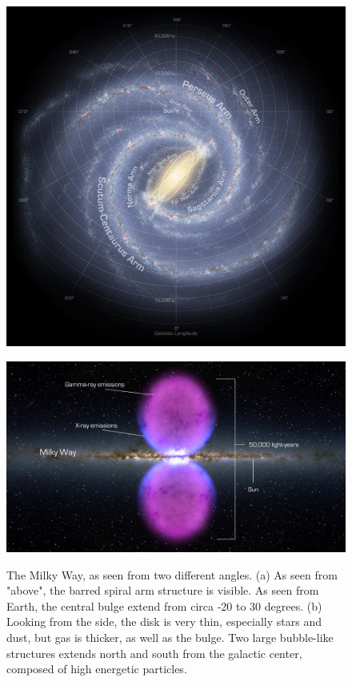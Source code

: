 \begin{figure}[h]
  \centering
  \begin{minipage}[h]{0.45\textwidth}
  	\centering
	\includegraphics[width=1.\linewidth]{pic/theory/top_galaxy_map.jpg}
  	\label{fig:top_gal_map}
  \end{minipage}
  \hfill
  \begin{minipage}[h]{0.45\textwidth}
	  \centering
	  \includegraphics[width=1.\linewidth]{pic/theory/Fermi_bubble.jpg}
	  \label{fig:fermi_bubbles}
  \end{minipage}
  \caption[The milky Way from different angles.]{The Milky Way, as seen from two different angles. (a) As seen from "above", the barred spiral arm structure is visible. As seen from Earth, the central bulge extend from circa -20 to 30 degrees. (b) Looking from the side, the disk is very thin, especially stars and dust, but gas is thicker, as well as the bulge. Two large bubble-like structures extends north and south from the galactic center, composed of high energetic particles.}
  \label{fig:Galaxy_maps} 
\end{figure}

